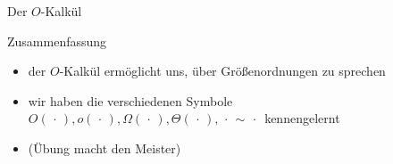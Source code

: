 \documentclass[aspectratio=1610, 11pt]{beamer}
\newcommand\nix{\,\cdot\,}
\begin{document}
\begin{frame}{Der $O$-Kalk\"ul}
	\begin{exampleblock}{Zusammenfassung}
		\begin{itemize}
			\item der $O$-Kalk\"ul erm\"oglicht uns, \"uber Gr\"o\ss enordnungen zu sprechen
			\item wir haben die verschiedenen Symbole $O(\nix),o(\nix),\Omega(\nix),\Theta(\nix),\nix\sim\nix$ kennengelernt
			\item (\"Ubung macht den Meister)
		\end{itemize}
	\end{exampleblock}
\end{frame}
\end{document}
